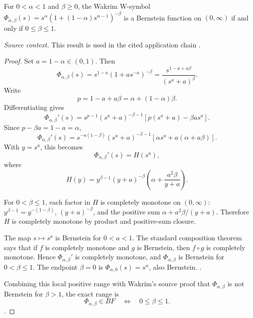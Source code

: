 \begin{proposition}
\label{res:wakrim-w-symbol-exact-bf-range}
For \(0<\alpha<1\) and \(\beta\ge0\), the Wakrim W-symbol \(\Phi_{\alpha,\beta}(s)=s^\alpha(1+(1-\alpha)s^{\alpha-1})^{-\beta}\) is a Bernstein function on \((0,\infty)\) if and only if \(0\le\beta\le1\).

\emph{Source context.} This result is used in the cited application chain \cite{wakrim-w}.
\end{proposition}
\begin{proof}
Set \(a=1-\alpha\in(0,1)\). Then
\[
\Phi_{\alpha,\beta}(s)
=s^{1-a}\left(1+a s^{-a}\right)^{-\beta}
=\frac{s^{1-a+a\beta}}{(s^a+a)^\beta}.
\]
Write
\[
p=1-a+a\beta=\alpha+(1-\alpha)\beta.
\]
Differentiating gives
\[
\Phi_{\alpha,\beta}'(s)
=s^{p-1}(s^a+a)^{-\beta-1}
\left[p(s^a+a)-\beta a s^a\right].
\]
Since \(p-\beta a=1-a=\alpha\),
\[
\Phi_{\alpha,\beta}'(s)
=s^{-a(1-\beta)}(s^a+a)^{-\beta-1}
\left[\alpha s^a+a(\alpha+a\beta)\right].
\]
With \(y=s^a\), this becomes
\[
\Phi_{\alpha,\beta}'(s)=H(s^a),
\]
where
\[
H(y)=
y^{\beta-1}(y+a)^{-\beta}
\left(\alpha+\frac{a^2\beta}{y+a}\right).
\]

For \(0<\beta\le1\), each factor in \(H\) is completely monotone on \((0,\infty)\): \(y^{\beta-1}=y^{-(1-\beta)}\), \((y+a)^{-\beta}\), and the positive sum \(\alpha+a^2\beta/(y+a)\). Therefore \(H\) is completely monotone by product and positive-sum closure.

The map \(s\mapsto s^a\) is Bernstein for \(0<a<1\). The standard composition theorem says that if \(f\) is completely monotone and \(g\) is Bernstein, then \(f\circ g\) is completely monotone. Hence \(\Phi_{\alpha,\beta}'\) is completely monotone, and \(\Phi_{\alpha,\beta}\) is Bernstein for \(0<\beta\le1\). The endpoint \(\beta=0\) is \(\Phi_{\alpha,0}(s)=s^\alpha\), also Bernstein. \cite{wakrim-w}.

Combining this local positive range with Wakrim's source proof that \(\Phi_{\alpha,\beta}\) is not Bernstein for \(\beta>1\), the exact range is
\[
\Phi_{\alpha,\beta}\in BF
\quad\Longleftrightarrow\quad
0\le\beta\le1.
\] \cite{wakrim-w}.
\end{proof}

